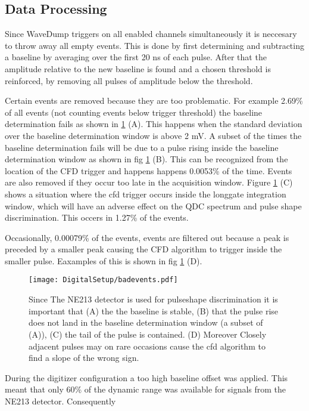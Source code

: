 \documentclass[main.tex]{subfiles}
\begin{document}
\subsection{Data Processing}
Since WaveDump triggers on all enabled channels simultaneously it is neccesary to throw away all empty events. This is done by first determining and subtracting a baseline by averaging over the first 20 ns of each pulse. After that the amplitude relative to the new baseline is found and a chosen threshold is reinforced, by removing all pulses of amplitude below the threshold.

Certain events are removed because they are too problematic. For example 2.69\% of all events (not counting events below trigger threshold) the baseline determination fails as shown in \ref{fig:badevents} (A). This happens when the standard deviation over the baseline determination window is above 2 mV. 
A subset of the times the baseline determination fails will be due to a pulse rising inside the baseline determination window as shown in fig \ref{fig:badevents} (B). This can be recognized from the location of the CFD trigger and happens happens 0.0053\% of the time. Events are also removed if they occur too late in the acquisition window. Figure \ref{fig:badevents} (C) shows a situation where the cfd trigger occurs inside the longgate integration window, which will have an adverse effect on the QDC spectrum and pulse shape discrimination. This occers in 1.27\% of the events.

Occasionally, 0.00079\% of the events, events are filtered out because a peak is preceded by a smaller peak causing the CFD algorithm to trigger inside the smaller pulse. Eaxamples of this is shown in fig \ref{fig:badevents} (D).
\begin{figure}[ht!]
    \centering
        \texttt{[image: DigitalSetup/badevents.pdf]}
        \caption{Since The NE213 detector is used for pulseshape discrimination it is important that (A) the the baseline is stable, (B) that the pulse rise does not land in the baseline determination window (a subset of (A)), (C) the tail of the pulse is contained. (D) Moreover Closely adjacent pulses may on rare occasions cause the cfd algorithm to find a slope of the wrong sign.}
    \label{fig:badevents} 
\end{figure}

During the digitizer configuration a too high baseline offset was applied. This meant that only 60\% of the dynamic range was available for signals from the NE213 detector. Consequently 
\end{document}
